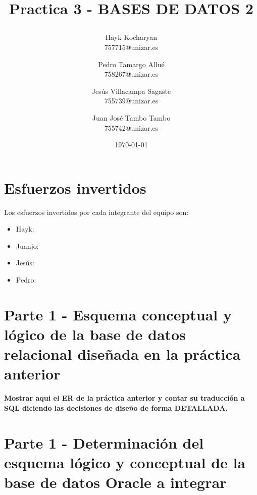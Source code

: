 \documentclass{article}
\begin{document}
\begin{titlepage}
	\title{
		\begin{Huge}
			Practica 3 - BASES DE DATOS 2
		\end{Huge}
	}
	\author{
	  Hayk Kocharyan\\
	  757715@unizar.es
	  \and
	  Pedro Tamargo Allué\\
	  758267@unizar.es
	  \and
	  Jesús Villacampa Sagaste\\
	  755739@unizar.es
	  \and
	  Juan José Tambo Tambo\\
	  755742@unizar.es
	}
	\date{\today}
	
	\clearpage\maketitle
	\thispagestyle{empty}
	\tableofcontents
	
\end{titlepage}

\newpage 

\section{Esfuerzos invertidos}
Los esfuerzos invertidos por cada integrante del equipo son:
\begin{itemize}
\item Hayk:

\item Juanjo:	

\item Jesús:

\item Pedro: 

\end{itemize}

\section{Parte 1 - Esquema conceptual y lógico de la base de datos relacional diseñada en la práctica anterior}

\textbf{Mostrar aqui el ER de la práctica anterior y contar su traducción a SQL diciendo las decisiones de diseño de forma DETALLADA.}

\section{Parte 1 - Determinación del esquema lógico y conceptual de la base de datos Oracle a integrar}
\end{document}
